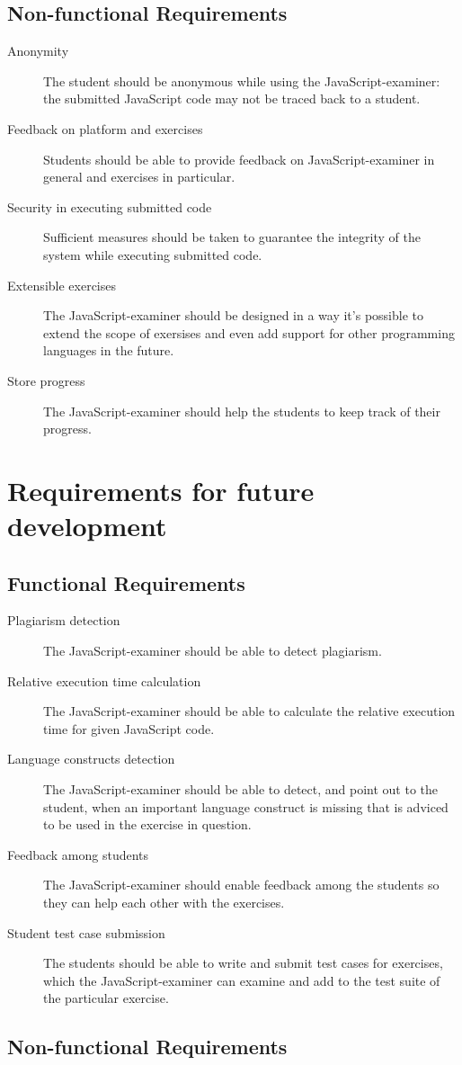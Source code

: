 \documentclass{article}
\begin{document}
\subsection{Non-functional Requirements}
\begin{description}
  \item[Anonymity] The student should be anonymous while using the
    JavaScript-examiner: the submitted JavaScript code may not be traced back
    to a student.
  \item[Feedback on platform and exercises] Students should be able to provide
    feedback on JavaScript-examiner in general and exercises in particular.
  \item[Security in executing submitted code] Sufficient measures should be
    taken to guarantee the integrity of the system while executing submitted
    code.
  \item[Extensible exercises] The JavaScript-examiner should be designed in a
    way it's possible to extend the scope of exersises and even add support for
    other programming languages in the future. 
  \item[Store progress] The JavaScript-examiner should help the students to
    keep track of their progress.
\end{description}


\section{Requirements for future development}
\subsection{Functional Requirements}
\begin{description}
  \item[Plagiarism detection] The JavaScript-examiner should be able to detect
    plagiarism.
  \item[Relative execution time calculation] The JavaScript-examiner should be 
    able to calculate the relative execution time for given JavaScript code.
  \item[Language constructs detection] The JavaScript-examiner should be able 
    to detect, and point out to the student, when an important language 
    construct is missing that is adviced to be used in the exercise in question.
  \item[Feedback among students] The JavaScript-examiner should enable feedback
    among the students so they can help each other with the exercises. 
  \item[Student test case submission] The students should be able to write and
    submit test cases for exercises, which the JavaScript-examiner can examine
    and add to the test suite of the particular exercise.
\end{description}
\subsection{Non-functional Requirements}
\end{document}
